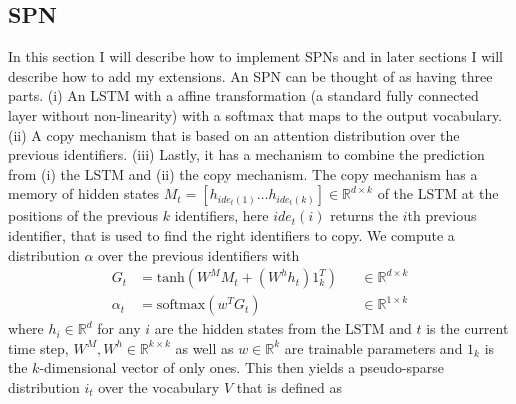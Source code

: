 \documentclass[11pt]{article}
\begin{document}
\subsection{SPN}
In this section I will describe how to implement SPNs and in later sections I will describe how to add my extensions. An SPN can be thought of as having three parts. (i) An LSTM with a affine transformation (a standard fully connected layer without non-linearity) with a softmax that maps to the output vocabulary. (ii) A copy mechanism that is based on an attention distribution over the previous identifiers. (iii) Lastly, it has a mechanism to combine the prediction from (i) the LSTM and (ii) the copy mechanism.
The copy mechanism has a memory of hidden states $M_t = [h_{ide_t(1)}\dots h_{ide_t(k)}] \in \mathbb{R}^{d \times k}$ of the LSTM at the positions of the previous $k$ identifiers, here $ide_t(i)$ returns the $i$th previous identifier, that is used to find the right identifiers to copy. We compute a distribution $\alpha$ over the previous identifiers with
\begin{align}
	G_{t} &= \text{tanh}(W^M M_{t} + (W^hh_t)1^T_k)       &&\in \mathbb{R}^{d\times k}\\
	\alpha_{t} &= \text{softmax}(w^TG_{t})                                  &&\in \mathbb{R}^{1\times k}
\end{align}
where $h_i \in \mathbb{R}^d$ for any $i$ are the hidden states from the LSTM and $t$ is the current time step, $W^M, W^h \in \mathbb{R}^{k \times k}$ as well as $w \in \mathbb{R}^k$ are trainable parameters and $1_k$ is the $k$-dimensional  vector of only ones.
This then yields a pseudo-sparse distribution $i_t$ over the vocabulary $V$ that is defined as
\end{document}
